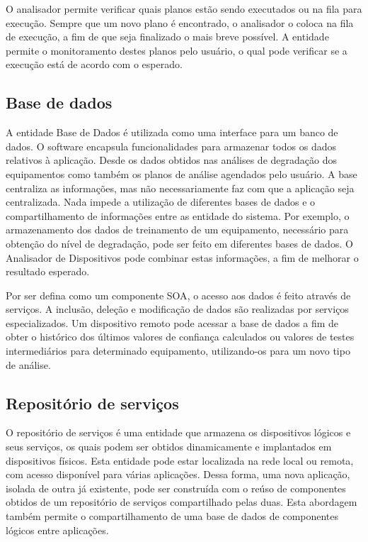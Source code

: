 O analisador permite verificar quais planos estão sendo executados ou na fila para execução. Sempre
que um novo plano é encontrado, o analisador o coloca na fila de execução, a fim de que seja
finalizado o mais breve possível. A entidade permite o monitoramento destes planos pelo usuário, o
qual pode verificar se a execução está de acordo com o esperado.


\subsection{Base de dados}

A entidade Base de Dados é utilizada como uma interface para um banco de dados. O software encapsula
funcionalidades para  armazenar todos os dados relativos à aplicação. Desde os dados obtidos nas
análises de degradação dos equipamentos como também os planos de análise agendados pelo usuário. A
base centraliza as informações, mas não necessariamente faz com que a aplicação seja centralizada.
Nada impede a utilização de diferentes bases de dados e o
compartilhamento de informações entre as entidade do sistema. Por exemplo, o armazenamento dos dados
de treinamento de um equipamento, necessário para obtenção do nível de degradação, pode ser feito em
diferentes bases de dados. O Analisador de Dispositivos pode combinar estas informações, a fim de
melhorar o resultado esperado.

Por ser defina como um componente \gls{SOA}, o acesso aos dados é feito através de serviços. A
inclusão, deleção e modificação de dados são realizadas por serviços especializados. Um dispositivo
remoto pode acessar a base de dados a fim de obter o histórico dos últimos valores de confiança
calculados ou valores de testes intermediários para determinado equipamento, utilizando-os para um
novo tipo de análise.


\subsection{Repositório de serviços}

O repositório de serviços é uma entidade que armazena os dispositivos lógicos e seus serviços, os
quais podem ser obtidos dinamicamente e implantados em dispositivos físicos. Esta entidade pode
estar localizada na rede local ou remota, com acesso disponível para várias aplicações. Dessa forma,
uma nova aplicação, isolada de outra já existente, pode ser construída com o reúso de componentes
obtidos de um repositório de serviços compartilhado pelas duas. Esta abordagem também permite o
compartilhamento de uma base de dados de componentes lógicos entre aplicações.


